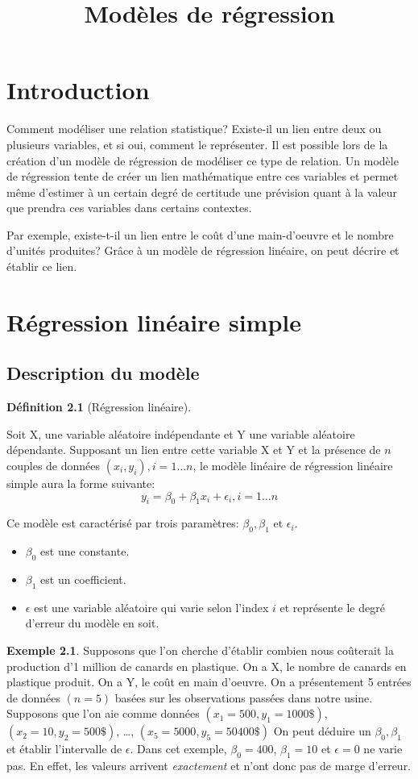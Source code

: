 \documentclass[12pt]{book}
\title{Modèles de régression}
\def\sep{\phantom{}}
\theoremstyle{definition}
\newtheorem{definition}{Définition}[section]
\newtheorem*{example}{Exemple}
\begin{document}
\chapter{Introduction}
Comment modéliser une relation statistique? Existe-il un lien entre deux ou plusieurs variables, et si oui, comment
le représenter. Il est possible lors de la création d'un modèle de régression de modéliser ce type de relation. Un modèle de régression tente de créer un lien mathématique entre ces 
variables et permet même d'estimer à un certain degré de certitude une prévision quant à la valeur que prendra ces 
variables dans certains contextes.

Par exemple, existe-t-il un lien entre le coût d'une main-d'oeuvre et le nombre d'unités produites? Grâce à un modèle de régression
linéaire, on peut décrire et établir ce lien.

\chapter{Régression linéaire simple}
\section{Description du modèle}
\begin{definition}[Régression linéaire]
    \label{def:regression_lineaire}
    
\end{definition}
Soit X, une variable aléatoire indépendante et Y une variable aléatoire dépendante. Supposant un lien entre cette variable X et Y 
et la présence de $n$ couples de données $(x_i, y_i), i=1 \dots n$, le modèle linéaire de régression linéaire simple aura la forme 
suivante:
$$ y_i = \beta_0 + \beta_1 x_i + \epsilon_i, i=1 \dots n $$ 


Ce modèle est caractérisé par trois paramètres: $\beta_0, \beta_1 \text{ et } \epsilon_i$.

\begin{itemize}
    \item $\beta_0$ est une constante.
    \item $\beta_1$ est un coefficient.
    \item $\epsilon$ est une variable aléatoire qui varie selon l'index $i$ et représente le degré d'erreur du modèle en soit.
\end{itemize}

\begin{example}
    Supposons que l'on cherche d'établir combien nous coûterait la production d'1 million de canards en plastique.
    On a X, le nombre de canards en plastique produit. \sep
    On a Y, le coût en main d'oeuvre. \sep
    On a présentement 5 entrées de données $(n=5)$ basées sur les observations passées dans notre usine. \sep
    Supposons que l'on aie comme données $(x_1 = 500, y_1 = 1000\$)$,$ (x_2 = 10, y_2 = 500\$)$, \dots, $(x_5 = 5000, y_5 = 50400\$)$ \sep 
    On peut déduire un $\beta_0, \beta_1 $ et établir l'intervalle de $\epsilon$. \sep
    Dans cet exemple, $\beta_0 = 400$, $\beta_1 = 10$ \sep 
    et $\epsilon = 0$ ne varie pas. En effet, les valeurs arrivent \textit{exactement} et n'ont donc pas de marge d'erreur.
\end{example}
\end{document}
